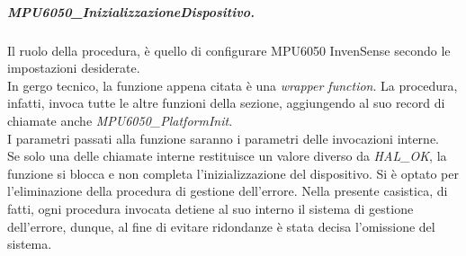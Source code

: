 \documentclass[11pt]{report}
\begin{document}
\subparagraph{MPU6050\_InizializzazioneDispositivo.}
Il ruolo della procedura, è quello di configurare MPU6050 InvenSense secondo le impostazioni desiderate.\\
In gergo tecnico, la funzione appena citata è una \textit{wrapper function}. La procedura, infatti, invoca tutte le altre funzioni della sezione, aggiungendo al suo record di chiamate anche \textit{MPU6050\_PlatformInit}.\\
I parametri passati alla funzione saranno i parametri delle invocazioni interne.\\
Se solo una delle chiamate interne restituisce un valore diverso da \textit{HAL\_OK}, la funzione si blocca e non completa l'inizializzazione del dispositivo.
Si è optato per l'eliminazione della procedura di gestione dell'errore. Nella presente casistica, di fatti, ogni procedura invocata detiene al suo interno il sistema di gestione dell'errore, dunque, al fine di evitare ridondanze è stata decisa l'omissione del sistema.
\newpage

\end{document}
